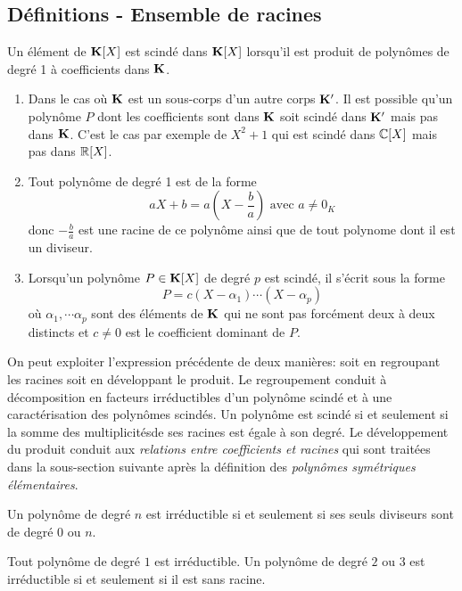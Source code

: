 
\hypersetup{pdftitle=2159}

\subsection{Définitions - Ensemble de racines}
\begin{defi}
 Un élément de $\mathbf{K}[X]$ est scindé dans $\mathbf{K}[X]$ lorsqu'il est produit de polynômes de degré 1 à coefficients dans $\mathbf{K}$.
\end{defi}
\begin{rems}
\begin{enumerate}
 \item Dans le cas où $\mathbf{K}$ est un sous-corps d'un autre corps $\mathbf{K}^\prime$. Il est possible qu'un polynôme $P$ dont les coefficients sont dans $\mathbf{K}$ soit scindé dans $\mathbf{K}^\prime$ mais pas dans $\mathbf{K}$. C'est le cas par exemple de $X^2+1$ qui est scindé dans $\mathbb{C}[X]$ mais pas dans $\mathbb{R}[X]$.
\item Tout polynôme de degré 1 est de la forme 
\begin{displaymath}
aX+b = a(X- \dfrac{b}{a}) \text{ avec } a\neq 0_K
\end{displaymath}
donc $-\frac{b}{a}$ est une racine de ce polynôme ainsi que de tout polynome dont il est un diviseur.
\item Lorsqu'un polynôme $P\in \mathbf{K}[X]$ de degré $p$ est scindé, il s'écrit sous la forme
\begin{equation}
 P = c(X-\alpha_1)\cdots (X-\alpha_p)
\end{equation}
où $\alpha_1, \cdots \alpha_p$ sont des éléments de $\mathbf{K}$ qui ne sont pas forcément deux à deux distincts et $c\neq0$ est le coefficient dominant de $P$.
\end{enumerate}
\end{rems}
 
On peut exploiter l'expression précédente de deux manières: soit en regroupant les racines soit en développant le produit.\newline
Le regroupement conduit à décomposition en facteurs irréductibles d'un polynôme scindé et à une caractérisation des polynômes scindés. Un polynôme est scindé si et seulement si la somme des multiplicitésde ses racines est égale à son degré.\newline
Le développement du produit conduit aux \emph{relations entre coefficients et racines} qui sont traitées dans la sous-section suivante après la définition des \emph{polynômes symétriques élémentaires}.
\begin{defi}
 Un polynôme de degré $n$ est irréductible si et seulement si ses seuls diviseurs sont de degré $0$ ou $n$.
\end{defi}
Tout polynôme de degré $1$ est irréductible. Un polynôme de degré $2$ ou $3$ est irréductible si et seulement si il est sans racine.

